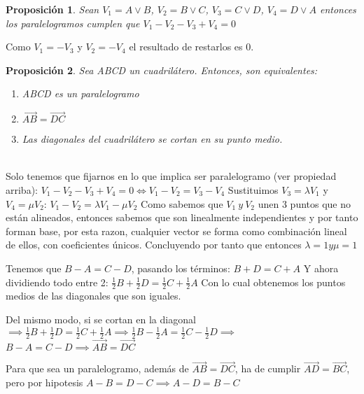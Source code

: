 \documentclass[11pt, a4paper]{article}
\makeatletter
\newif\IfInSansMode
\let\oldsf\sffamily
\renewcommand*{\sffamily}{\oldsf\mathversion{sans}\InSansModetrue}
\let\oldnorm\normalfont
\renewcommand*{\normalfont}{\oldnorm\InSansModefalse\mathversion{normal}}
\renewenvironment{proof}[1][\proofname] {\vspace{-15pt}\par\pushQED{\qed}\normalfont\topsep6\p@\@plus6\p@\relax\trivlist\item[\hskip\labelsep\it#1\@addpunct{.}]\ignorespaces}{\popQED\endtrivlist\@endpefalse}
\renewcommand{\vec}{\overrightarrow}
\renewenvironment{proof}[1][\proofname] {\par\pushQED{\qed}\normalfont\topsep6\p@\@plus6\p@\relax\trivlist\item[\hskip\labelsep\itshape\sffamily#1\@addpunct{.}]\ignorespaces}{\popQED\endtrivlist\@endpefalse}
\theoremstyle{theorem-style}
\newtheorem{nprop}{Proposición}[section]
\theoremstyle{definition-style}
\theoremstyle{remark-style}
\theoremstyle{example-style}
\newenvironment{nlist}
{\begin{enumerate}
    \renewcommand\labelenumi{(\emph{\roman{enumi})}}}
  {\end{enumerate}}
\makeatother
\begin{document}
\hfill


\begin{nprop}
	Sean $V_{1} = A \vee B$, $V_{2} = B \vee C$, $V_{3} = C\vee D$, $V_{4} = D \vee A$ entonces los paralelogramos cumplen que $V_{1} - V_{2} - V_{3} + V_{4} = 0$
 
\end{nprop}

\begin{proof} \hfill
	
		 Como $V_1 = -V_3$ y $V_2 =-V_4$ el resultado de restarlos es $0$.
\end{proof}


\begin{nprop}
  Sea ABCD un cuadrilátero. Entonces, son equivalentes:
  \begin{nlist}
  \item ABCD es un paralelogramo
  \item $\vec{AB} = \vec{DC}$
  \item Las diagonales del cuadrilátero se cortan en su punto medio.
  \end{nlist}
\end{nprop}


\begin{proof} \hfill \\
  Solo tenemos que fijarnos en lo que implica ser paralelogramo (ver propiedad arriba):
  $V_{1} - V_{2} - V_{3} + V_{4} = 0 \Leftrightarrow V_{1} - V_{2} = V_{3} - V_{4} $
  Sustituimos $V_{3} = \lambda V_{1}$ y $V_{4} = \mu V_{2}$:
  $V_{1} - V_{2} = \lambda V_{1} - \mu V_{2}$
  Como sabemos que $V_{1}\ y\ V_{2}$ unen 3 puntos que no están alineados, entonces sabemos que son linealmente independientes y por
  tanto forman base, por esta razon, cualquier vector se forma como combinación lineal de ellos, con coeficientes únicos.
  Concluyendo por tanto que entonces $\lambda = 1 y \mu = 1$

  Tenemos que $B - A = C - D$, pasando los términos:
  $B + D = C + A$
  Y ahora dividiendo todo entre 2:
  $\frac{1}{2}B + \frac{1}{2}D = \frac{1}{2}C + \frac{1}{2}A$
  Con lo cual obtenemos los puntos medios de las diagonales que son iguales.

   Del mismo modo, si se cortan en la diagonal 
  $\implies \frac{1}{2}B + \frac{1}{2}D = \frac{1}{2}C + \frac{1}{2}A \implies 
  \frac{1}{2}B - \frac{1}{2}A = \frac{1}{2}C - \frac{1}{2}D \implies $ $B - A = C - D \implies \vec{AB} = \vec{DC}$
  
   Para que sea un paralelogramo, además de $\vec{AB} = \vec{DC}$, ha de cumplir $\vec{AD} = \vec{BC}$, pero por hipotesis $A - B = D - C \implies A - D = B - C$
  
\end{proof}
\end{document}
